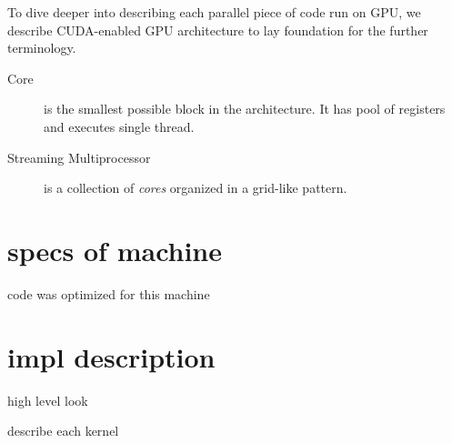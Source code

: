 To dive deeper into describing each parallel piece of code run on GPU, we describe CUDA-enabled GPU architecture to lay foundation for the further terminology.
\begin{description}
	\item[Core] is the smallest possible block in the architecture. It has pool of registers and executes single thread.
	\item[Streaming Multiprocessor] is a collection of \emph{cores} organized in a grid-like pattern.
\end{description}

\section{specs of machine}

code was optimized for this machine

\section{impl description}

high level look

describe each kernel